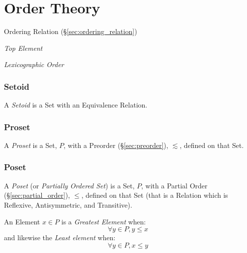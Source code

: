 \part{Order Theory}\label{sec:order_theory}

Ordering Relation (\S\ref{sec:ordering_relation})

\emph{Top Element}

\emph{Lexicographic Order}



\section{Setoid}\label{sec:setoid}

A \emph{Setoid} is a Set with an Equivalence Relation.



\section{Proset}\label{sec:proset}

A \emph{Proset} is a Set, $P$, with a Preorder
(\S\ref{sec:preorder}), $\lesssim$, defined on that Set.



\section{Poset}\label{sec:poset}

A \emph{Poset} (or \emph{Partially Ordered Set}) is a Set, $P$, with a
Partial Order (\S\ref{sec:partial_order}), $\leq$, defined on that
Set (that is a Relation which is Reflexive, Antisymmetric, and
Transitive).

An Element $x \in P$ is a \emph{Greatest Element} when:
\[
  \forall y \in P, y \leq x
\]
and likewise the \emph{Least element} when:
\[
  \forall y \in P, x \leq y
\]

